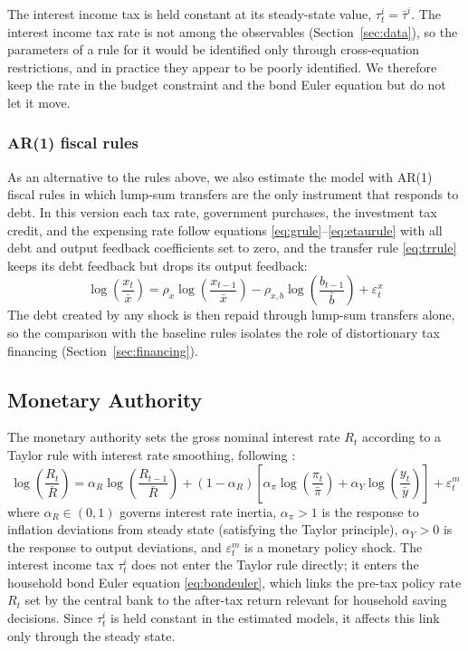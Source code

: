 \documentclass[article,11pt,letterpaper,fleqn]{article}
\theoremstyle{definition}
\numberwithin{equation}{section}
\begin{document}
The interest income tax is held constant at its steady-state value, $\tau_t^i = \bar{\tau}^i$. The interest income tax rate is not among the observables (Section~\ref{sec:data}), so the parameters of a rule for it would be identified only through cross-equation restrictions, and in practice they appear to be poorly identified. We therefore keep the rate in the budget constraint and the bond Euler equation but do not let it move.

\subsubsection*{AR(1) fiscal rules}

As an alternative to the rules above, we also estimate the model with AR(1) fiscal rules in which lump-sum transfers are the only instrument that responds to debt. In this version each tax rate, government purchases, the investment tax credit, and the expensing rate follow equations \eqref{eq:grule}--\eqref{eq:etaurule} with all debt and output feedback coefficients set to zero, and the transfer rule \eqref{eq:trrule} keeps its debt feedback but drops its output feedback:
\begin{equation}\label{eq:trrule_ar1}
\log\!\left(\frac{x_t}{\bar{x}}\right) = \rho_{x}\log\!\left(\frac{x_{t-1}}{\bar{x}}\right) - \rho_{x,b}\log\!\left(\frac{b_{t-1}}{\bar{b}}\right) + \varepsilon_t^{x}
\end{equation}
The debt created by any shock is then repaid through lump-sum transfers alone, so the comparison with the baseline rules isolates the role of distortionary tax financing (Section~\ref{sec:financing}).


\subsection{Monetary Authority}

The monetary authority sets the gross nominal interest rate $R_t$ according to a Taylor rule with interest rate smoothing, following \citet{Zubairy2014}:
\begin{equation}\label{eq:taylor}
\log\!\left(\frac{R_t}{\bar{R}}\right) = \alpha_R\log\!\left(\frac{R_{t-1}}{\bar{R}}\right) + (1-\alpha_R)\!\left[\alpha_\pi\log\!\left(\frac{\pi_t}{\bar{\pi}}\right) + \alpha_Y\log\!\left(\frac{y_t}{\bar{y}}\right)\right] + \varepsilon_t^m
\end{equation}
where $\alpha_R \in (0,1)$ governs interest rate inertia, $\alpha_\pi > 1$ is the response to inflation deviations from steady state (satisfying the Taylor principle), $\alpha_Y > 0$ is the response to output deviations, and $\varepsilon_t^m$ is a monetary policy shock. The interest income tax $\tau_t^i$ does not enter the Taylor rule directly; it enters the household bond Euler equation \eqref{eq:bondeuler}, which links the pre-tax policy rate $R_t$ set by the central bank to the after-tax return relevant for household saving decisions. Since $\tau_t^i$ is held constant in the estimated models, it affects this link only through the steady state.
\end{document}
